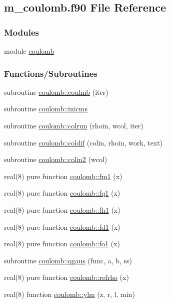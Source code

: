 \hypertarget{m__coulomb_8f90}{}\subsection{m\+\_\+coulomb.\+f90 File Reference}
\label{m__coulomb_8f90}
\subsubsection*{Modules}
\begin{DoxyCompactItemize}
\item 
module \hyperlink{namespacecoulomb}{coulomb}
\end{DoxyCompactItemize}
\subsubsection*{Functions/\+Subroutines}
\begin{DoxyCompactItemize}
\item 
subroutine \hyperlink{namespacecoulomb_aa3e07b3e57f999248a4455e242a08a82}{coulomb\+::coulmb} (iter)
\item 
subroutine \hyperlink{namespacecoulomb_a71d2dcc1344753ecd57ec7701f3f31b1}{coulomb\+::inicms}
\item 
subroutine \hyperlink{namespacecoulomb_a5899dd9afaa8627e389d6826ac8b9356}{coulomb\+::colrun} (rhoin, wcol, iter)
\item 
subroutine \hyperlink{namespacecoulomb_a3ac2bcc29280c44868fa4b084e391d9b}{coulomb\+::coldif} (colin, rhoin, work, text)
\item 
subroutine \hyperlink{namespacecoulomb_ae21242beace81666adc0b8bb2169ebe7}{coulomb\+::colin2} (wcol)
\item 
real(8) pure function \hyperlink{namespacecoulomb_a8e0d9a77cf57de887f33aa23a850282e}{coulomb\+::fm1} (x)
\item 
real(8) pure function \hyperlink{namespacecoulomb_a479d5221bb08a0de30ab429406600221}{coulomb\+::fq1} (x)
\item 
real(8) pure function \hyperlink{namespacecoulomb_a3a7b49f543c1e4b721ba4de54daa1c10}{coulomb\+::fh1} (x)
\item 
real(8) pure function \hyperlink{namespacecoulomb_a236fa98bfaa5df522910063c93eacb88}{coulomb\+::fd1} (x)
\item 
real(8) pure function \hyperlink{namespacecoulomb_a80a8fbc67f2192f8d89c4bfb8b936058}{coulomb\+::fo1} (x)
\item 
subroutine \hyperlink{namespacecoulomb_a7a8e275790d560b09ae8acb5a02cb905}{coulomb\+::qgaus} (func, a, b, ss)
\item 
real(8) pure function \hyperlink{namespacecoulomb_ad214b3c159dee54bdffd506cea64a056}{coulomb\+::refrho} (x)
\item 
real(8) function \hyperlink{namespacecoulomb_a320b9e470846321992301fb5cfd25304}{coulomb\+::ylm} (z, r, l, min)
\end{DoxyCompactItemize}
